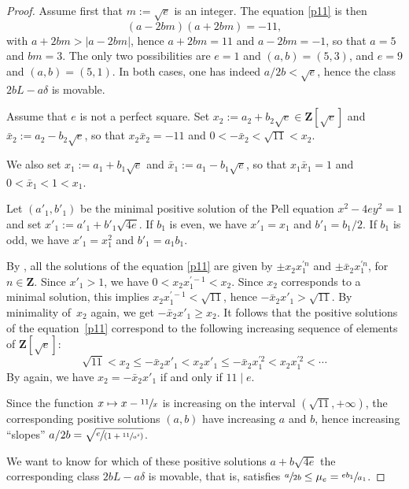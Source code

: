 \documentclass[JEP,XML,SOM,Unicode, NoEqCountersInSection,NoFloatCountersInSection]{cedram}
\newcommand\mto{\mathchoice{\longmapsto}{\mapsto}{\mapsto}{\mapsto}}
\newcommand{\spfrac}[2]{\sfrac{#1}{(#2)}}
\theoremstyle{definition}
\newcommand\Z{{\mathbf Z}}
\let\Ld L
\begin{document}
\begin{proof}
Assume first that $m:=\sqrt{e}$ is an integer. The equation \eqref{p11} is then
\[
(a-2bm)(a+2bm)=-11,
\]
with $a+2bm>|a-2bm|$, hence
$a+2bm=11$ and $a-2bm=-1$, so that $a=5$ and $bm=3$. The only two possibilities are $e=1$ and $(a,b)=(5,3)$, and $e=9$ and $(a,b)=(5,1)$. In both cases, one has indeed $a/2b<\sqrt{e}$, hence the class
$2b\Ld-a\delta$ is movable.

Assume that $e$ is not a perfect square. Set
$x_2:=a_2+b_2\sqrt{e}\in\Z[\sqrt{e}]$ and $\bar x_2:=a_2-b_2\sqrt{e}$, so that $x_2\bar x_2= -11$ and $0<-\bar x_2< \sqrt{11}<x_2$.

We also set $x_1:=a_1+b_1\sqrt{e}$ and $\bar x_1:=a_1-b_1\sqrt{e}$, so that $x_1\bar x_1= 1$ and $0<\bar x_1< 1<x_1$.

Let $(a'_1,b'_1)$ be the minimal positive solution of the Pell equation $x^2-4ey^2=1$ and set $x'_1:=a'_1+b'_1\sqrt{4e}$. If $b_1$ is even, we have $x'_1=x_1$ and $b'_1=b_1/2$. If $b_1$ is odd, we have $x'_1=x_1^2$ and $b'_1=a_1b_1$.

By \cite[Th.\,110]{nage},
all the solutions of the equation \eqref{p11} are given by $\pm x_2x_1^{\prime n}$ and $\pm \bar x_2x_1^{\prime n}$, for $n\in \Z$. Since $x'_1>1$, we have $0<x_2x_1^{\prime -1}<x_2$. Since $x_2$ corresponds to a minimal solution, this implies $x_2x_1^{\prime -1}< \sqrt{11}$, hence $-\bar x_2x'_1>\sqrt{11}$. By minimality of~$x_2$ again, we get $-\bar x_2x'_1\ge x_2$. It follows that the positive solutions of the equation~\eqref{p11} correspond to the following increasing sequence of elements of $\Z[\sqrt{e}]$:
\begin{equation}\label{sols}
\sqrt{11}<x_2\le -\bar x_2x'_1<x_2x'_1\le -\bar x_2x_1^{\prime 2}<x_2x_1^{\prime 2}<\cdots
\end{equation}
By \cite[Th.\,110]{nage} again, we have $x_2= -\bar x_2x'_1$ if and only if $11\mid e$.

Since the function $x\mto x-\sfrac{11}{x}$ is increasing on the interval $(\sqrt{11},+\infty)$, the corresponding positive solutions $(a,b)$ have increasing $a$ and $b$, hence increasing ``slopes'' $a/2b=\sqrt{\spfrac{e}{ 1+\sfrac{11}{a^2}}}$.

We want to know for which of these positive solutions $a+b\sqrt{4e}$ the corresponding class $2b\Ld-a\delta$ is movable, that is, satisfies $\sfrac{a}{2b} \le \mu_e=\sfrac{eb_1}{a_1}$.


\end{proof}
\end{document}
